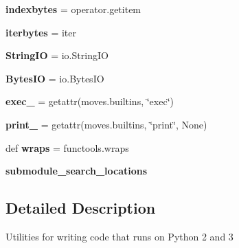 \begin{DoxyCompactItemize}
\mbox{\label{namespacesetuptools_1_1__vendor_1_1six_a4cc1ffbbd5d4cb86611ae3b649f8a749}} 
{\bfseries indexbytes} = operator.\+getitem
\item 
\mbox{\label{namespacesetuptools_1_1__vendor_1_1six_a17a1a4d8b57a3250891cb8d46312879d}} 
{\bfseries iterbytes} = iter
\item 
\mbox{\label{namespacesetuptools_1_1__vendor_1_1six_a027c31384163e40efec5aecf67d2ac74}} 
{\bfseries String\+IO} = io.\+String\+IO
\item 
\mbox{\label{namespacesetuptools_1_1__vendor_1_1six_ac09d47d877509aa2c3d989fb0a59e70b}} 
{\bfseries Bytes\+IO} = io.\+Bytes\+IO
\item 
\mbox{\label{namespacesetuptools_1_1__vendor_1_1six_ab0729695d921188f96de43ee6440b10a}} 
{\bfseries exec\+\_\+} = getattr(moves.\+builtins, \char`\"{}exec\char`\"{})
\item 
\mbox{\label{namespacesetuptools_1_1__vendor_1_1six_a21703705a7fa75d1b467c0f9859eda8d}} 
{\bfseries print\+\_\+} = getattr(moves.\+builtins, \char`\"{}print\char`\"{}, None)
\item 
\mbox{\label{namespacesetuptools_1_1__vendor_1_1six_aa5afc2f05814eb041a4bd24fa60da337}} 
def {\bfseries wraps} = functools.\+wraps
\item 
\mbox{\label{namespacesetuptools_1_1__vendor_1_1six_a79d846383f3a4c572eedebf2a9078f27}} 
{\bfseries submodule\+\_\+search\+\_\+locations}
\end{DoxyCompactItemize}


\subsection{Detailed Description}
\begin{DoxyVerb}Utilities for writing code that runs on Python 2 and 3\end{DoxyVerb}
 

